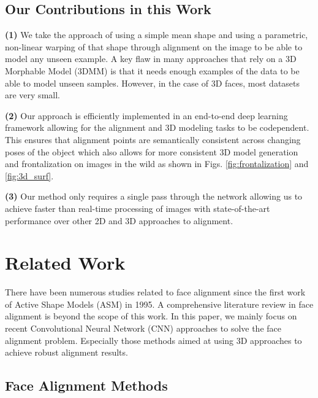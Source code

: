 \documentclass[10pt,twocolumn,letterpaper]{article}
\begin{document}
\subsection{Our Contributions in this Work}
\textbf{(1)} We take the approach of using a simple mean shape and using a parametric, non-linear warping of that shape through alignment on the image to be able to model any unseen example. A key flaw in many approaches that rely on a 3D Morphable Model (3DMM) is that it needs enough examples of the data to be able to model unseen samples. However, in the case of 3D faces, most datasets are very small.

\textbf{(2)} Our approach is efficiently implemented in an end-to-end deep learning framework allowing for the alignment and 3D modeling tasks to be codependent. This ensures that alignment points are semantically consistent across changing poses of the object which also allows for more consistent 3D model generation and frontalization on images in the wild as shown in Figs. \ref{fig:frontalization} and \ref{fig:3d_surf}. 

\textbf{(3)} Our method only requires a single pass through the network allowing us to achieve faster than real-time processing of images with state-of-the-art performance over other 2D and 3D approaches to alignment.
\section{Related Work}

There have been numerous studies related to face alignment since the first work of Active Shape Models (ASM) \cite{cootes1995active} in 1995. A comprehensive literature review in face alignment is beyond the scope of this work.
In this paper, we mainly focus on
recent Convolutional Neural Network (CNN) approaches to solve the face alignment problem. Especially those methods aimed at using 3D approaches to achieve robust alignment results.

\subsection{Face Alignment Methods}
\end{document}
